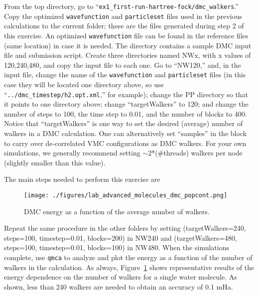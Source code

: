 From the top directory, go to ``\texttt{ex1\_first-run-hartree-fock/dmc\_walkers}.'' Copy the
optimized \texttt{wavefunction} and \texttt{particleset} files used in the previous calculations to the current
folder; these are the files generated during step 2 of this exercise. An optimized \texttt{wavefunction} file can be found in the reference files (same location) in case it is needed. The directory
contains a sample DMC input file and submission script. Create three  directories named NWx,
with x values of 120,240,480, and copy the input file to each one. Go
to ``NW120,'' and, in the input file, change the name of the \texttt{wavefunction} and \texttt{particleset}
files (in this case they will be located one directory above, so use ``\texttt{../dmc\_timestep/h2.opt.xml},'' for
example); change the PP directory so that it points to one directory above; change ``targetWalkers'' to 120; and change the number of steps to 100, the time step
to 0.01, and the number of blocks to 400. Notice that ``targetWalkers'' is one way to set the desired (average) number of walkers in a DMC calculation. One can alternatively set ``samples'' in the  block to carry over de-correlated VMC configurations as DMC walkers. For your own simulations, we generally recommend setting $\sim$2*(\#threads)
walkers per node (slightly smaller than this value).

The main steps needed to perform this exercise are

\begin{figure}
\begin{center}
\texttt{[image: ./figures/lab\_advanced\_molecules\_dmc\_popcont.png]}
\end{center}
\caption{DMC energy as a function of the average number of walkers.}
\label{fig:lam_dmc_popcont}
\end{figure}

Repeat the same procedure in the other folders by setting (targetWalkers=240,
steps=100, timestep=0.01, blocks=200) in NW240 and (targetWalkers=480, 
steps=100, timestep=0.01, blocks=100) in NW480. When
the simulations complete, use \texttt{qmca} to analyze and plot the energy as a function of the
number of walkers in the calculation. As always, Figure~\ref{fig:lam_dmc_popcont} 
shows representative results of the
energy dependence on the number of walkers for a single water molecule. As shown,
less than 240 walkers are needed to obtain an accuracy of 0.1 mHa.


